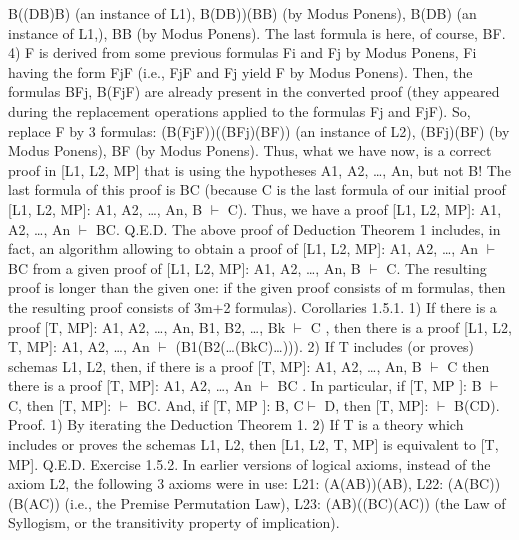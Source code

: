 B\IMPLIES ((D\IMPLIES B)\IMPLIES B) (an instance of L1),
B\IMPLIES (D\IMPLIES B))\IMPLIES (B\IMPLIES B) (by Modus Ponens),
B\IMPLIES (D\IMPLIES B) (an instance of L1,),
B\IMPLIES B (by Modus Ponens).
The last formula is here, of course, B\IMPLIES F.
4) F is derived from some previous formulas Fi and Fj by Modus Ponens, Fi having the form Fj\IMPLIES F (i.e.,
Fj\IMPLIES F and Fj yield F by Modus Ponens). Then, the formulas
B\IMPLIES Fj,
B\IMPLIES (Fj\IMPLIES F)
are already present in the converted proof (they appeared during the replacement operations applied to the
formulas Fj and Fj\IMPLIES F). So, replace F by 3 formulas:
(B\IMPLIES (Fj\IMPLIES F))\IMPLIES ((B\IMPLIES Fj)\IMPLIES (B\IMPLIES F)) (an instance of L2),
(B\IMPLIES Fj)\IMPLIES (B\IMPLIES F) (by Modus Ponens),
B\IMPLIES F (by Modus Ponens).
Thus, what we have now, is a correct proof in [L1, L2, MP] that is using the hypotheses A1, A2, \ldots , An, but
not B! The last formula of this proof is B\IMPLIES C (because C is the last formula of our initial proof [L1, L2,
MP]: A1, A2, \ldots , An, B \(\vdash\) C). Thus, we have a proof [L1, L2, MP]: A1, A2, \ldots , An \(\vdash\) B\IMPLIES C. Q.E.D.
The above proof of Deduction Theorem 1 includes, in fact, an algorithm allowing to obtain a proof of
[L1, L2, MP]: A1, A2, \ldots , An \(\vdash\) B\IMPLIES C from a given proof of [L1, L2, MP]: A1, A2, \ldots , An, B \(\vdash\) C. The
resulting proof is longer than the given one: if the given proof consists of m formulas, then the resulting
proof consists of 3m+2 formulas).
Corollaries 1.5.1. 1) If there is a proof [T, MP]: A1, A2, \ldots , An, B1, B2, \ldots , Bk \(\vdash\) C , then there is a proof
[L1, L2, T, MP]: A1, A2, \ldots , An \(\vdash\) (B1\IMPLIES (B2\IMPLIES (\ldots \IMPLIES (Bk\IMPLIES C)\ldots ))).
2) If T includes (or proves) schemas L1, L2, then, if there is a proof [T, MP]: A1, A2, \ldots , An, B \(\vdash\) C then
there is a proof [T, MP]: A1, A2, \ldots , An \(\vdash\) B\IMPLIES C .
In particular, if [T, MP ]: B \(\vdash\) C, then [T, MP]: \(\vdash\) B\IMPLIES C.
And, if [T, MP ]: B, C\(\vdash\) D, then [T, MP]: \(\vdash\) B\IMPLIES (C\IMPLIES D).
Proof. 1) By iterating the Deduction Theorem 1.
2) If T is a theory which includes or proves the schemas L1, L2, then [L1, L2, T, MP] is equivalent to [T,
MP]. Q.E.D.
Exercise 1.5.2. In earlier versions of logical axioms, instead of the axiom L2, the following 3 axioms
were in use:
L21: (A\IMPLIES (A\IMPLIES B))\IMPLIES (A\IMPLIES B),
L22: (A\IMPLIES (B\IMPLIES C))\IMPLIES (B\IMPLIES (A\IMPLIES C)) (i.e., the Premise Permutation Law),
L23: (A\IMPLIES B)\IMPLIES ((B\IMPLIES C)\IMPLIES (A\IMPLIES C)) (the Law of Syllogism, or the transitivity property of implication).
